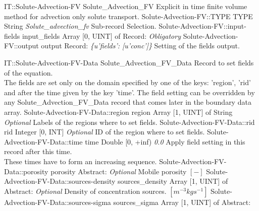 \begin{RecordType}
	{IT::Solute-Advection-FV}
	{Solute{\_}Advection{\_}FV}
	{} %
	{} %
	{{{Explicit in time finite volume method for advection only solute transport.}}}
		\RecKey
			{Solute-Advection-FV::TYPE}
			{TYPE}
			{{String}}
			{ \it{Solute{\_}advection{\_}fv} }
			{{{Sub-record Selection.}}}
		\RecKey
			{Solute-Advection-FV::input-fields}
			{input{\_}fields}
			{{Array [0, UINT] of }{Record}{: }}
			{ \it{Obligatory} }
			{}
		\RecKey
			{Solute-Advection-FV::output}
			{output}
			{{Record}{: }}
			{ \it{{\{}u'fields': [u'conc']{\}}} }
			{{{Setting of the fields output.}}}
\end{RecordType}
\begin{RecordType}
	{IT::Solute-Advection-FV-Data}
	{Solute{\_}Advection{\_}FV{\_}Data}
	{} %
	{} %
	{{{Record to set fields of the equation.}\\{
The fields are set only on the domain specified by one of the keys: 'region', 'rid'}\\{
and after the time given by the key 'time'. The field setting can be overridden by}\\{
 any Solute{\_}Advection{\_}FV{\_}Data record that comes later in the boundary data array.}}}
		\RecKey
			{Solute-Advection-FV-Data::region}
			{region}
			{{Array [1, UINT] of }{String}}
			{ \it{Optional} }
			{{{Labels of the regions where to set fields. }}}
		\RecKey
			{Solute-Advection-FV-Data::rid}
			{rid}
			{{Integer [0, INT]}}
			{ \it{Optional} }
			{{{ID of the region where to set fields.}}}
		\RecKey
			{Solute-Advection-FV-Data::time}
			{time}
			{{Double [0, +inf)}}
			{ \it{0.0} }
			{{{Apply field setting in this record after this time.}\\{
These times have to form an increasing sequence.}}}
		\RecKey
			{Solute-Advection-FV-Data::porosity}
			{porosity}
			{{Abstract}{: }}
			{ \it{Optional} }
			{{{Mobile porosity }{$[-]$}}}
		\RecKey
			{Solute-Advection-FV-Data::sources-density}
			{sources{\_}density}
			{{Array [1, UINT] of }{Abstract}{: }}
			{ \it{Optional} }
			{{{Density of concentration sources. }{$[m^{-3}kgs^{-1}]$}}}
		\RecKey
			{Solute-Advection-FV-Data::sources-sigma}
			{sources{\_}sigma}
			{{Array [1, UINT] of }{Abstract}{: }}

\end{RecordType}

